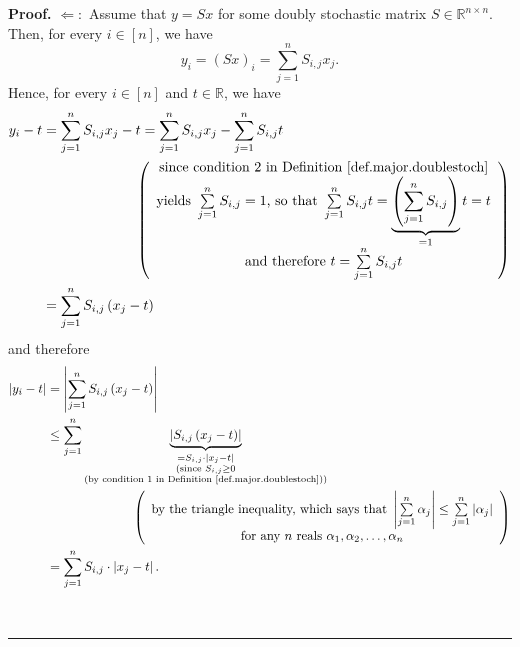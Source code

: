 \documentclass[numbers=enddot,12pt,final,onecolumn,notitlepage]{scrartcl}%
\numberwithin{exer}{subsection}
\theoremstyle{definition}
\newenvironment{proof}[1][Proof]{\noindent\textbf{#1.} }{\ \rule{0.5em}{0.5em}}
\let\sumnonlimits\sum
\renewcommand{\sum}{\sumnonlimits\limits}
\begin{document}
\begin{proof}
$\Longleftarrow:$ Assume that $y=Sx$ for some doubly stochastic matrix
$S\in\mathbb{R}^{n\times n}$. Then, for every $i\in\left[  n\right]  $, we
have%
\begin{equation}
y_{i}=\left(  Sx\right)  _{i}=\sum_{j=1}^{n}S_{i,j}x_{j}.
\label{pf.thm.major.doublestoch.maj.denn.yi=}%
\end{equation}
Hence, for every $i\in\left[  n\right]  $ and $t\in\mathbb{R}$, we have%
\begin{align*}
y_{i}-t  &  =\sum_{j=1}^{n}S_{i,j}x_{j}-t=\sum_{j=1}^{n}S_{i,j}x_{j}%
-\sum_{j=1}^{n}S_{i,j}t\\
&  \ \ \ \ \ \ \ \ \ \ \ \ \ \ \ \ \ \ \ \ \left(
\begin{array}
[c]{c}%
\text{since condition 2 in Definition \ref{def.major.doublestoch}}\\
\text{yields }\sum_{j=1}^{n}S_{i,j}=1\text{, so that }\sum_{j=1}^{n}%
S_{i,j}t=\underbrace{\left(  \sum_{j=1}^{n}S_{i,j}\right)  }_{=1}t=t\\
\text{and therefore }t=\sum_{j=1}^{n}S_{i,j}t
\end{array}
\right) \\
&  =\sum_{j=1}^{n}S_{i,j}\left(  x_{j}-t\right)
\end{align*}
and therefore%
\begin{align}
\left\vert y_{i}-t\right\vert  &  =\left\vert \sum_{j=1}^{n}S_{i,j}\left(
x_{j}-t\right)  \right\vert \nonumber\\
&  \leq\sum_{j=1}^{n}\underbrace{\left\vert S_{i,j}\left(  x_{j}-t\right)
\right\vert }_{\substack{=S_{i,j}\cdot\left\vert x_{j}-t\right\vert
\\\text{(since }S_{i,j}\geq0\\\text{(by condition 1 in Definition
\ref{def.major.doublestoch}))}}}\nonumber\\
&  \ \ \ \ \ \ \ \ \ \ \ \ \ \ \ \ \ \ \ \ \left(
\begin{array}
[c]{c}%
\text{by the triangle inequality, which says that }\left\vert \sum_{j=1}%
^{n}\alpha_{j}\right\vert \leq\sum_{j=1}^{n}\left\vert \alpha_{j}\right\vert
\\
\text{for any }n\text{ reals }\alpha_{1},\alpha_{2},\ldots,\alpha_{n}%
\end{array}
\right) \nonumber\\
&  =\sum_{j=1}^{n}S_{i,j}\cdot\left\vert x_{j}-t\right\vert .
\label{pf.thm.major.doublestoch.maj.denn.2}%
\end{align}



\end{proof}
\end{document}
